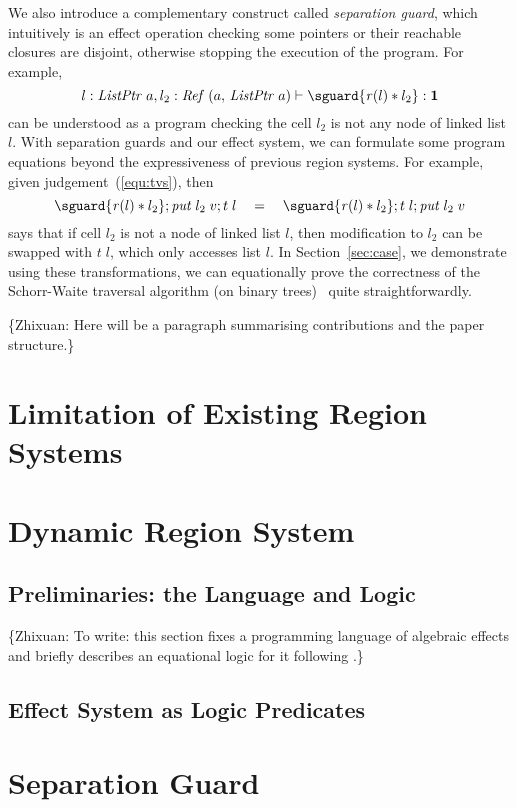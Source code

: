 \documentclass[runningheads]{llncs}
\DeclarePairedDelimiter\sguard[]
\newcommand{\Zhixuan}[2][blue]{{\color{#1}\{Zhixuan: #2\}}}
\begin{document}
We also introduce a complementary construct called \emph{separation guard}, which intuitively is an effect operation checking some pointers or their reachable closures are disjoint, otherwise stopping the execution of the program.
For example,
\[l : \mathit{ListPtr}\;a, l_2 : \mathit{Ref}\; (a,\,\mathit{ListPtr} \; a) \vdash \sguard{\mathit{r}(l) * l_2} : \mathbf{1}\]
can be understood as a program checking the cell $l_2$ is not any node of linked list $l$.
With separation guards and our effect system, we can formulate some program equations beyond the expressiveness of previous region systems.
For example, given judgement~(\ref{equ:tvs}), then
\[ \sguard{\mathit{r}(l) * l_2};\mathit{put} \; l_2 \; v; t\; l \quad = \quad \sguard{\mathit{r}(l) * l_2}; t\; l; \mathit{put} \; l_2 \; v  \]
says that if cell $l_2$ is not a node of linked list $l$, then modification to $l_2$ can be swapped with $t\;l$, which only accesses list $l$.
In Section~\ref{sec:case}, we demonstrate using these transformations, we can equationally prove the correctness of the Schorr-Waite traversal algorithm (on binary trees)~\cite{Schorr1967} quite straightforwardly.

\Zhixuan{Here will be a paragraph summarising contributions and the paper structure.}
\section{Limitation of Existing Region Systems}\label{sec:prob}

\section{Dynamic Region System}
\subsection{Preliminaries: the Language and Logic}
\Zhixuan[red]{To write: this section fixes a programming language of algebraic effects and briefly describes an equational logic for it following \cite{Plotkin2008,Pretnar2010}.}

\subsection{Effect System as Logic Predicates}

\section{Separation Guard}
\end{document}
